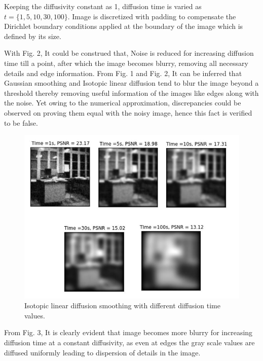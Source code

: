 \documentclass{ipol}
\begin{document}
Keeping the diffusivity constant as 1, diffusion time is varied as $t = \{1, 5, 10, 30, 100\}$. Image is discretized with padding to compensate the Dirichlet boundary conditions applied at the boundary of the image which is defined by its size.

With Fig. 2, It could be construed that, Noise is reduced for increasing diffusion time till a point, after which the image becomes blurry, removing all necessary details and edge information.
From Fig. 1 and Fig. 2, It can be inferred that Gaussian smoothing and Isotopic linear diffusion tend to blur the image beyond a threshold thereby removing useful information of the images like edges along with the noise. Yet owing to the numerical approximation, discrepancies could be observed on proving them equal with the noisy image, hence this fact is verified to be false.
\begin{figure}[!htbp]
\begin{center}
\includegraphics[scale=0.75]{./images/IsotropicLinearDiffusion}
\caption{Isotopic linear diffusion smoothing with different diffusion time values.}
\label{fig:example}
\end{center}
\end{figure}

From Fig. 3, It is clearly evident that image becomes more blurry for increasing diffusion time at a constant diffusivity, as even at edges the gray scale values are diffused uniformly leading to dispersion of details in the image.
\end{document}
